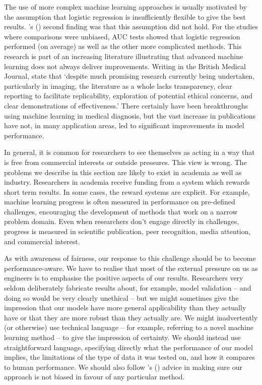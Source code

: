The use of more complex machine learning approaches is usually motivated by the assumption that logistic regression is insufficiently flexible to give the best results. \citeauthor{christodoulou2019systematic}'s (\citeyear{christodoulou2019systematic}) second finding was that this assumption did not hold. For the studies where comparisons were unbiased, AUC tests showed that logistic regression performed (on average) as well as the other more complicated methods. This research is part of an increasing literature illustrating that advanced machine learning does not always deliver improvements. Writing in the British Medical Journal, \textcite{vollmer2020machine} state that `despite much promising research currently being undertaken, particularly in imaging, the literature as a whole lacks transparency, clear reporting to facilitate replicability, exploration of potential ethical concerns, and clear demonstrations of effectiveness.' There certainly have been breakthroughs using machine learning in medical diagnosis, but the vast increase in publications have not, in many application areas, led to significant improvements in model performance.

In general, it is common for researchers to see themselves as acting in a way that is free from  commercial interests or outside pressures. This view is wrong. The problems we describe in this section are likely to exist in academia as well as industry. Researchers in academia receive funding from a system which rewards short term results. In some cases, the reward systems are explicit. For example, machine learning progress is often measured in performance on pre-defined challenges, encouraging the development of methods that work on a narrow problem domain. Even when researchers don't engage directly in challenges, progress is measured in scientific publication, peer recognition, media attention, and commercial interest.

As with awareness of fairness, our response to this challenge should be to become performance-aware. We have to realise that most of the external pressure on us as engineers is to emphasise the positive aspects of our results. Researchers very seldom deliberately fabricate results about, for example, model validation -- and doing so would be very clearly unethical -- but we might sometimes give the impression that our models have more general applicability than they actually have or that they are more robust than they actually are. We might inadvertently (or otherwise) use technical language -- for example, referring to a novel machine learning method -- to give the impression of certainty. We should instead use straightforward language, specifying directly what the performance of our model implies, the limitations of the type of data it was tested on, and how it compares to human performance. We should also follow \citeauthor{christodoulou2019systematic}'s (\citeyear{christodoulou2019systematic})  advice in making sure our approach is not biased in favour of any particular method.

